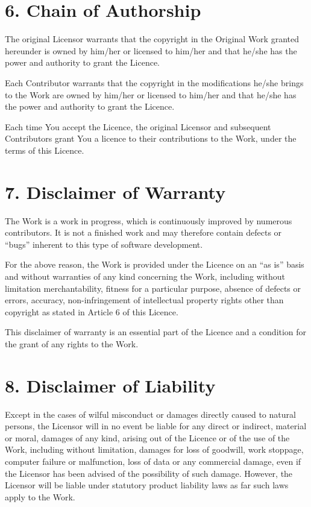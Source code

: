\documentclass[letterpaper,10pt,english]{sphinxmanual}
\begin{document}
\section{6. Chain of Authorship}
\label{license:chain-of-authorship}
The original Licensor warrants that the copyright in the Original Work granted
hereunder is owned by him/her or licensed to him/her and that he/she has the power
and authority to grant the Licence.

Each Contributor warrants that the copyright in the modifications he/she brings to the
Work are owned by him/her or licensed to him/her and that he/she has the power and
authority to grant the Licence.

Each time You accept the Licence, the original Licensor and subsequent Contributors
grant You a licence to their contributions to the Work, under the terms of this
Licence.


\section{7. Disclaimer of Warranty}
\label{license:disclaimer-of-warranty}
The Work is a work in progress, which is continuously improved by numerous
contributors. It is not a finished work and may therefore contain defects or “bugs”
inherent to this type of software development.

For the above reason, the Work is provided under the Licence on an “as is” basis and
without warranties of any kind concerning the Work, including without limitation
merchantability, fitness for a particular purpose, absence of defects or errors,
accuracy, non-infringement of intellectual property rights other than copyright as
stated in Article 6 of this Licence.

This disclaimer of warranty is an essential part of the Licence and a condition for the
grant of any rights to the Work.


\section{8. Disclaimer of Liability}
\label{license:disclaimer-of-liability}
Except in the cases of wilful misconduct or damages directly caused to natural
persons, the Licensor will in no event be liable for any direct or indirect, material or
moral, damages of any kind, arising out of the Licence or of the use of the Work,
including without limitation, damages for loss of goodwill, work stoppage, computer
failure or malfunction, loss of data or any commercial damage, even if the Licensor
has been advised of the possibility of such damage. However, the Licensor will be
liable under statutory product liability laws as far such laws apply to the Work.
\end{document}
